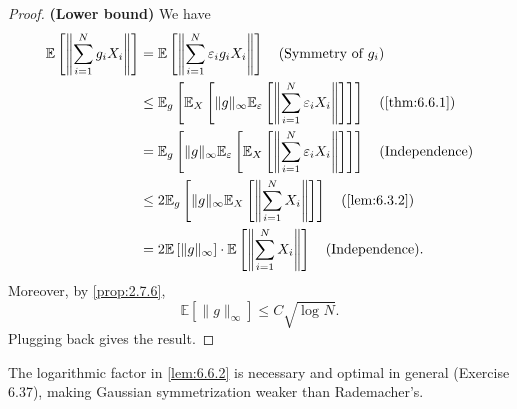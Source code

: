 \begin{proof}
\textbf{(Lower bound)} We have 
\begin{align*}
	\mathbb{E}\left[ \left\lVert \sum_{i = 1}^{N} g_i X_i \right\rVert \right] 
	&= \mathbb{E}\left[ \left\lVert \sum_{i = 1}^{N} \varepsilon_i g_i X_i \right\rVert \right] \quad 
	\text{(Symmetry of $g_i$)} \\
	&\leq \mathbb{E}_g\left[ \mathbb{E}_X\left[ \lVert g \rVert_{\infty} 
	\mathbb{E}_{\varepsilon}\left[ \left\lVert \sum_{i = 1}^{N} \varepsilon_i X_i 
	\right\rVert \right] \right] \right] \quad \text{(\cref{thm:6.6.1})} \\
	&= \mathbb{E}_g\left[ \lVert g \rVert_{\infty} \mathbb{E}_{\varepsilon}\left[ \mathbb{E}_X\left[ 
	\left\lVert \sum_{i = 1}^{N} \varepsilon_i X_i \right\rVert \right] \right] \right] \quad 
	\text{(Independence)} \\
	&\leq 2 \mathbb{E}_g\left[ \lVert g \rVert_{\infty} \mathbb{E}_X\left[ \left\lVert 
    \sum_{i = 1}^{N} X_i\right\rVert \right] \right] \quad \text{(\cref{lem:6.3.2})} \\
	&= 2 \mathbb{E}\left[ \lVert g \rVert_{\infty} \right] \cdot 
	\mathbb{E}\left[ \left\lVert \sum_{i = 1}^{N} X_i \right\rVert \right] \quad \text{(Independence).}
\end{align*}
Moreover, by \cref{prop:2.7.6}, 
\[ \mathbb{E}\left[ \lVert g \rVert_{\infty} \right] \leq C \sqrt{\log_{}{N}}. \]
Plugging back gives the result.
\end{proof}

\begin{remark}
\label{rmk:6.6.3}
The logarithmic factor in \cref{lem:6.6.2} is necessary and optimal in general (Exercise 6.37), making 
Gaussian symmetrization weaker than Rademacher's.
\end{remark}
